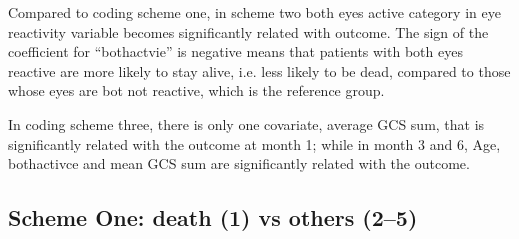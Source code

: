 \documentclass{article}
\begin{document}
Compared to coding scheme one, in scheme two both eyes active category in eye reactivity variable becomes significantly related with outcome. The sign of the coefficient for ``bothactvie'' is negative means that patients with both eyes reactive are more likely to stay alive, i.e. less likely to be dead, compared to those whose eyes are bot not reactive, which is the reference group.

In coding scheme three, there is only one covariate, average GCS sum, that is significantly related with the outcome at month 1; while in month 3 and 6, Age, bothactivce and mean GCS sum are significantly related with the outcome.


\subsection{Scheme One: death (1) vs others (2--5)}
\end{document}
